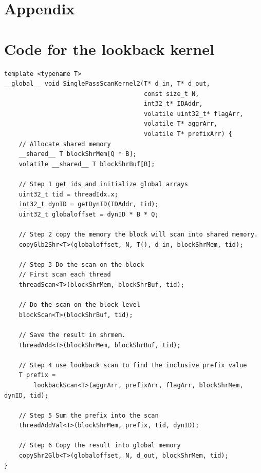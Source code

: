 \documentclass[twocolumn]{article}
\begin{document}
\onecolumn

\newpage

\section{Appendix}

\appendix

\section{Code for the lookback kernel}

\begin{lstlisting}[caption=Lookback kernel,label=lst:lookbackKernel]
template <typename T>
__global__ void SinglePassScanKernel2(T* d_in, T* d_out,
                                      const size_t N,
                                      int32_t* IDAddr,
                                      volatile uint32_t* flagArr,
                                      volatile T* aggrArr,
                                      volatile T* prefixArr) {
    // Allocate shared memory
    __shared__ T blockShrMem[Q * B];
    volatile __shared__ T blockShrBuf[B];

    // Step 1 get ids and initialize global arrays
    uint32_t tid = threadIdx.x;
    int32_t dynID = getDynID(IDAddr, tid);
    uint32_t globaloffset = dynID * B * Q;

    // Step 2 copy the memory the block will scan into shared memory.
    copyGlb2Shr<T>(globaloffset, N, T(), d_in, blockShrMem, tid);

    // Step 3 Do the scan on the block
    // First scan each thread
    threadScan<T>(blockShrMem, blockShrBuf, tid);

    // Do the scan on the block level
    blockScan<T>(blockShrBuf, tid);

    // Save the result in shrmem.
    threadAdd<T>(blockShrMem, blockShrBuf, tid);

    // Step 4 use lookback scan to find the inclusive prefix value
    T prefix =
        lookbackScan<T>(aggrArr, prefixArr, flagArr, blockShrMem, dynID, tid);

    // Step 5 Sum the prefix into the scan
    threadAddVal<T>(blockShrMem, prefix, tid, dynID);

    // Step 6 Copy the result into global memory
    copyShr2Glb<T>(globaloffset, N, d_out, blockShrMem, tid);
}
\end{lstlisting}

\newpage
\end{document}
